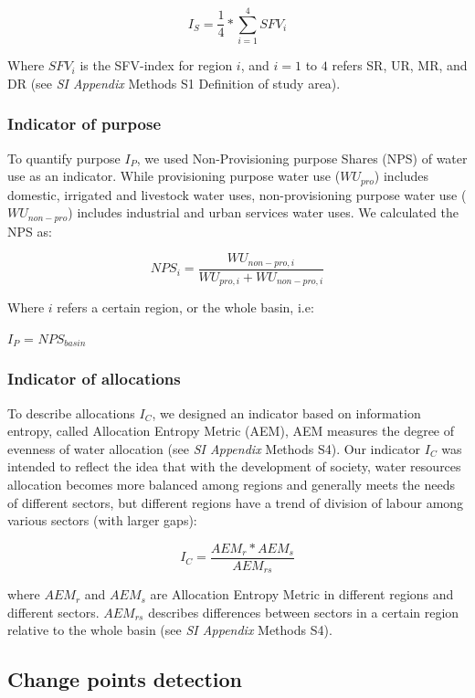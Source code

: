 \documentclass[9pt, twocolumn, twoside, lineno]{pnas-new}
\begin{document}
{	$$ I_S = \frac{1}{4} * \sum_{i=1}^4 SFV_{i} $$
	
	Where $SFV_i$ is the SFV-index for region $i$, and $i=1$ to $4$ refers SR, UR, MR, and DR (see \textit{SI Appendix} Methods S1 Definition of study area).

	\subsubsection*{Indicator of purpose}
	To quantify purpose $I_P$, we used Non-Provisioning purpose Shares (NPS) of water use as an indicator. While provisioning purpose water use ($WU_{pro}$) includes domestic, irrigated and livestock water uses, non-provisioning purpose water use ($WU_{non-pro}$) includes industrial and urban services water uses. We calculated the NPS as:

	$$ NPS_{i} = \frac{WU_{non-pro, i}}{WU_{pro, i} + WU_{non-pro, i}} $$

	Where $i$ refers a certain region, or the whole basin, i.e:

	$I_P$ = $NPS_{basin}$

	\subsubsection*{Indicator of allocations}
	To describe allocations $I_C$, we designed an indicator based on information entropy, called Allocation Entropy Metric (AEM), AEM measures the degree of evenness of water allocation (see \textit{SI Appendix} Methods S4).
	Our indicator $I_C$ was intended to reflect the idea that with the development of society, water resources allocation becomes more balanced among regions and generally meets the needs of different sectors, but different regions have a trend of division of labour among various sectors (with larger gaps):

	$$ I_C = \frac{AEM_{r}*AEM_{s}}{AEM_{rs}}$$
	
	where $AEM_{r}$ and $AEM_{s}$ are Allocation Entropy Metric in different regions and different sectors. $AEM_{rs}$ describes differences between sectors in a certain region relative to the whole basin (see \textit{SI Appendix} Methods S4). 

	\subsection*{Change points detection}

}
\end{document}
